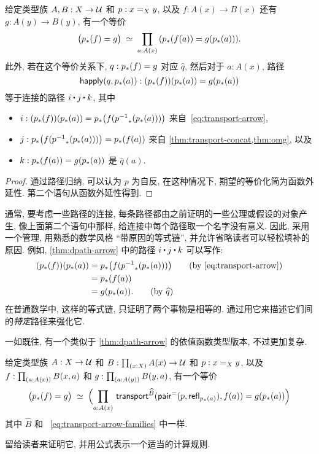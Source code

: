 \begin{lem}
    \label{thm:dpath-arrow}
    给定类型族 $A,B:X\to\type$ 和 $p:\id[X]xy$, 以及 $f:A(x)\to B(x)$ 还有 $g:A(y)\to B(y)$, 有一个等价
    \[ \eqvspaced{ \big(\trans{p}{f} = {g}\big) } { \prd{a:A(x)}  (\trans{p}{f(a)} = g(\trans{p}{a})) }. \]
    此外, 若在这个等价关系下, $q:\trans{p}{f} = {g}$ 对应 $\widehat q$, 然后对于 $a:A(x)$, 路径
    \[ \happly(q,\trans p a) : (\trans p f)(\trans p a) = g(\trans p a)\]
    等于连接的路径 $i\ct j\ct k$, 其中
    \begin{itemize}
        \item $i:(\trans p f)(\trans p a) = \trans p {f (\trans {\opp p}{\trans p a})}$ 来自~\eqref{eq:transport-arrow},
        \item $j:\trans p {f (\trans {\opp p}{\trans p a})} = \trans p {f(a)}$ 来自 \cref{thm:transport-concat,thm:omg}, 以及
        \item $k:\trans p {f(a)}= g(\trans p a)$ 是 $\widehat{q}(a)$.
    \end{itemize}
\end{lem}
\begin{proof}
    通过路径归纳, 可以认为 $p$ 为自反, 在这种情况下, 期望的等价化简为函数外延性.
    第二个语句从函数外延性得到.
\end{proof}

通常, 要考虑一些路径的连接, 每条路径都由之前证明的一些公理或假设的对象产生, 像上面第二个语句中那样, 给连接中每个路径取一个名字没有意义.
因此, 采用一个管理, 用熟悉的数学风格 ``带原因的等式链'', 并允许省略读者可以轻松填补的原因.
例如, \cref{thm:dpath-arrow} 中的路径 $i\ct j\ct k$ 可以写作:
\begin{align*}
(\trans p f)(\trans p a)
    &= \trans p {f (\trans {\opp p}{\trans p a})}
    \tag{by~\eqref{eq:transport-arrow}}\\
    &= \trans p {f(a)}\\
    &= g(\trans p a).
    \tag{by $\widehat{q}$}
\end{align*}
在普通数学中, 这样的等式链, 只证明了两个事物是相等的.
通过用它来描述它们间的\emph{特定}路径来强化它.

一如既往, 有一个类似于 \cref{thm:dpath-arrow} 的依值函数类型版本, 不过更加复杂.

\begin{lem}
    \label{thm:dpath-forall}
    给定类型族 $A:X\to\type$ 和 $B:\prd{x:X} A(x)\to\type$ 和 $p:\id[X]xy$, 以及 $f:\prd{a:A(x)} B(x,a)$ 和 $g:\prd{a:A(y)} B(y,a)$, 有一个等价
    \[ \eqvspaced{ \big(\trans{p}{f} = {g}\big) } { \Parens{\prd{a:A(x)}  \transfib{\widehat{B}}{\pairpath(p,\refl{\trans pa})}{f(a)} = g(\trans{p}{a}) } } \]
    其中 $\widehat{B}$ 和 ~\eqref{eq:transport-arrow-families} 中一样.
\end{lem}

留给读者来证明它, 并用公式表示一个适当的计算规则.

%
%
%